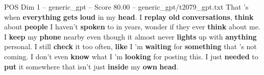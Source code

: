 \begin{textsample}{POS Dim 1 – generic\_gpt – Score 80.00 – generic\_gpt/t2079\_gpt.txt}
That ’s when \textbf{everything} \textbf{gets} \textbf{loud} in my \textbf{head}.
I \textbf{replay} \textbf{old} \textbf{conversations}, \textbf{think} about \textbf{people} I haven't \textbf{spoken} to in years, wonder if they ever \textbf{think} about me.
I \textbf{keep} my \textbf{phone} nearby even though it almost never \textbf{lights} up with \textbf{anything} personal.
I still \textbf{check} it too often, \textbf{like} I ’m \textbf{waiting} for \textbf{something} that ’s not coming.
I don't even \textbf{know} what I ’m \textbf{looking} for posting this.
I just \textbf{needed} to \textbf{put} it somewhere that isn't just \textbf{inside} my \textbf{own} \textbf{head}.

\end{textsample}
